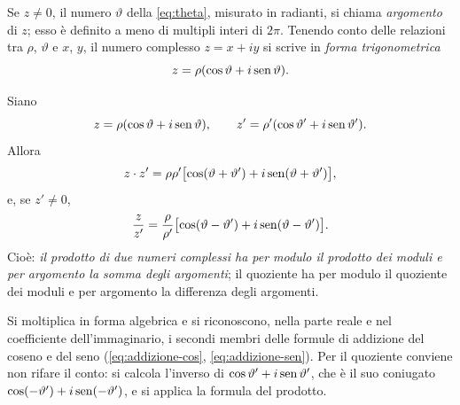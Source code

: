 \begin{definizione}
Se $z\neq0$, il numero $\vartheta$ della \eqref{eq:theta}, misurato in radianti, si
chiama \emph{argomento} di $z$; esso è definito a meno di multipli interi di $2\pi$.
Tenendo conto delle relazioni tra $\rho$, $\vartheta$ e $x$, $y$, il numero complesso
$z=x+iy$ si scrive in \emph{forma trigonometrica}
\begin{equation}\label{eq:forma-trigonometrica}
  z=\rho(\cos\vartheta+i\operatorname{sen}\vartheta).
\end{equation}
\end{definizione}

\begin{teorema}\label{teo:prodotto-trigonometrico}
Siano
\begin{equation}\label{eq:due-complessi}
  z=\rho(\cos\vartheta+i\operatorname{sen}\vartheta), \qquad z'=\rho'(\cos\vartheta'+i\operatorname{sen}\vartheta').
\end{equation}
Allora
\begin{equation}\label{eq:prodotto-trigonometrico}
  z\cdot z'=\rho\rho'\bigl[\cos(\vartheta+\vartheta')+i\operatorname{sen}(\vartheta+\vartheta')\bigr],
\end{equation}
e, se $z'\neq0$,
\begin{equation}\label{eq:quoziente-trigonometrico}
  \frac{z}{z'}=\frac{\rho}{\rho'}\bigl[\cos(\vartheta-\vartheta')+i\operatorname{sen}(\vartheta-\vartheta')\bigr].
\end{equation}
Cioè: \emph{il prodotto di due numeri complessi ha per modulo il prodotto dei moduli e
per argomento la somma degli argomenti}; il quoziente ha per modulo il quoziente dei
moduli e per argomento la differenza degli argomenti.
\end{teorema}

\begin{schema}
\end{schema}

\begin{strategia}
Si moltiplica in forma algebrica e si riconoscono, nella parte reale e nel coefficiente
dell'immaginario, i secondi membri delle formule di addizione del coseno e del seno
(\eqref{eq:addizione-cos}, \eqref{eq:addizione-sen}). Per il quoziente conviene non
rifare il conto: si calcola l'inverso di $\cos\vartheta'+i\operatorname{sen}\vartheta'$, che è il suo
coniugato $\cos(-\vartheta')+i\operatorname{sen}(-\vartheta')$, e si applica la formula del prodotto.
\end{strategia}


